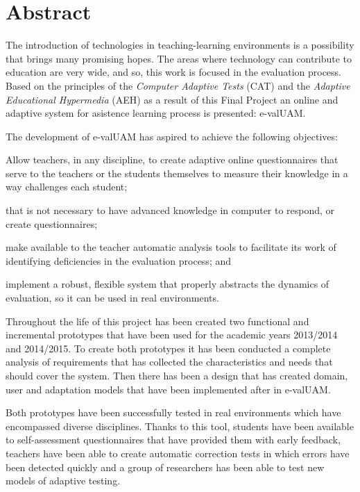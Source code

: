 \chapter*{Abstract}

\begin{abstractEn}
The introduction of technologies in teaching-learning environments is a possibility that brings many promising hopes. The areas where technology can contribute to education are very wide, and so, this work is focused in the evaluation process. Based on the principles of the \textit{Computer Adaptive Tests} (\acrshort {CAT}) and the \textit {Adaptive Educational Hypermedia} (\acrshort {AEH}) as a result of this Final Project an online and adaptive system for asistence learning process is presented: e-valUAM.

The development of e-valUAM has aspired to achieve the following objectives:
\begin{enumerate*}[label=\alph*\upshape)]
\item Allow teachers, in any discipline, to create adaptive online questionnaires that serve to the teachers or the students themselves to measure their knowledge in a way challenges each student;
\item that is not necessary to have advanced knowledge in computer to respond, or create questionnaires;
\item make available to the teacher automatic analysis tools to facilitate its work of identifying deficiencies in the evaluation process; and 
\item implement a robust, flexible system that properly abstracts the dynamics of evaluation, so it can be used in real environments.
\end{enumerate*}

Throughout the life of this project has been created two functional and incremental prototypes that have been used for the academic years 2013/2014 and 2014/2015. To create both prototypes it has been conducted a complete analysis of requirements that has collected the characteristics and needs that should cover the system. Then there has been a design that has created domain, user and adaptation models that have been implemented after in e-valUAM.

Both prototypes have been successfully tested in real environments which have encompassed diverse disciplines. Thanks to this tool, students have been available to self-assessment questionnaires that have provided them with early feedback, teachers have been able to create automatic correction tests in which errors have been detected quickly and a group of researchers has been able to test new models of adaptive testing.
\end{abstractEn}

